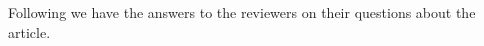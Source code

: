 \vspace{1cm}

Following we have the answers to the reviewers on their questions about the article. 
